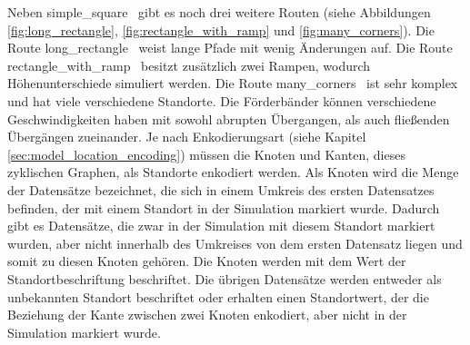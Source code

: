 \newpage
Neben \glqq simple\_square \grqq\ gibt es noch drei weitere Routen (siehe Abbildungen \ref{fig:long_rectangle}, \ref{fig:rectangle_with_ramp} und \ref{fig:many_corners}).
Die Route \glqq long\_rectangle \grqq\ weist lange Pfade mit wenig Änderungen auf.
Die Route \glqq rectangle\_with\_ramp \grqq\ besitzt zusätzlich zwei Rampen, wodurch Höhenunterschiede simuliert werden.
Die Route \glqq many\_corners \grqq\ ist sehr komplex und hat viele verschiedene Standorte.
Die Förderbänder können verschiedene Geschwindigkeiten haben mit sowohl abrupten Übergangen, als auch fließenden Übergängen zueinander.
\newline
\newline
Je nach Enkodierungsart (siehe Kapitel \ref{sec:model_location_encoding}) müssen die Knoten und Kanten, dieses zyklischen Graphen, als Standorte enkodiert werden.
Als Knoten wird die Menge der Datensätze bezeichnet, die sich in einem Umkreis des ersten Datensatzes befinden, der mit einem Standort in der Simulation markiert wurde.
Dadurch gibt es Datensätze, die zwar in der Simulation mit diesem Standort markiert wurden, aber nicht innerhalb des Umkreises von dem ersten Datensatz liegen
und somit zu diesen Knoten gehören.
Die Knoten werden mit dem Wert der Standortbeschriftung beschriftet.
Die übrigen Datensätze werden entweder als unbekannten Standort beschriftet oder erhalten einen Standortwert, der die Beziehung der Kante zwischen zwei Knoten enkodiert,
aber nicht in der Simulation markiert wurde.